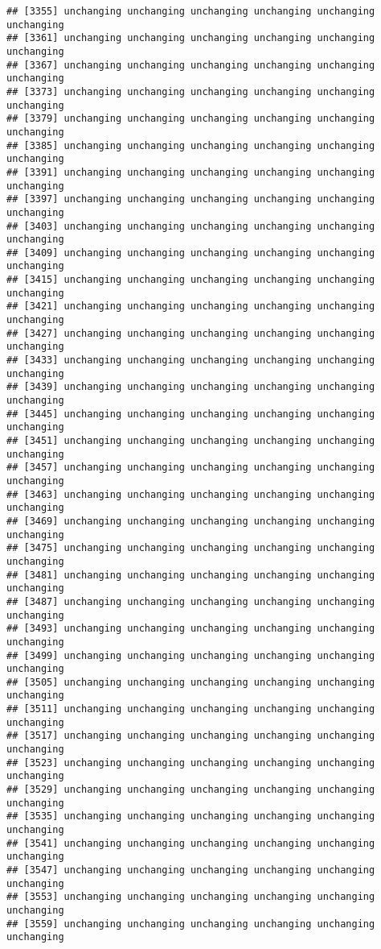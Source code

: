 \documentclass[]{article}
\begin{document}
\begin{verbatim}
## [3355] unchanging unchanging unchanging unchanging unchanging unchanging
## [3361] unchanging unchanging unchanging unchanging unchanging unchanging
## [3367] unchanging unchanging unchanging unchanging unchanging unchanging
## [3373] unchanging unchanging unchanging unchanging unchanging unchanging
## [3379] unchanging unchanging unchanging unchanging unchanging unchanging
## [3385] unchanging unchanging unchanging unchanging unchanging unchanging
## [3391] unchanging unchanging unchanging unchanging unchanging unchanging
## [3397] unchanging unchanging unchanging unchanging unchanging unchanging
## [3403] unchanging unchanging unchanging unchanging unchanging unchanging
## [3409] unchanging unchanging unchanging unchanging unchanging unchanging
## [3415] unchanging unchanging unchanging unchanging unchanging unchanging
## [3421] unchanging unchanging unchanging unchanging unchanging unchanging
## [3427] unchanging unchanging unchanging unchanging unchanging unchanging
## [3433] unchanging unchanging unchanging unchanging unchanging unchanging
## [3439] unchanging unchanging unchanging unchanging unchanging unchanging
## [3445] unchanging unchanging unchanging unchanging unchanging unchanging
## [3451] unchanging unchanging unchanging unchanging unchanging unchanging
## [3457] unchanging unchanging unchanging unchanging unchanging unchanging
## [3463] unchanging unchanging unchanging unchanging unchanging unchanging
## [3469] unchanging unchanging unchanging unchanging unchanging unchanging
## [3475] unchanging unchanging unchanging unchanging unchanging unchanging
## [3481] unchanging unchanging unchanging unchanging unchanging unchanging
## [3487] unchanging unchanging unchanging unchanging unchanging unchanging
## [3493] unchanging unchanging unchanging unchanging unchanging unchanging
## [3499] unchanging unchanging unchanging unchanging unchanging unchanging
## [3505] unchanging unchanging unchanging unchanging unchanging unchanging
## [3511] unchanging unchanging unchanging unchanging unchanging unchanging
## [3517] unchanging unchanging unchanging unchanging unchanging unchanging
## [3523] unchanging unchanging unchanging unchanging unchanging unchanging
## [3529] unchanging unchanging unchanging unchanging unchanging unchanging
## [3535] unchanging unchanging unchanging unchanging unchanging unchanging
## [3541] unchanging unchanging unchanging unchanging unchanging unchanging
## [3547] unchanging unchanging unchanging unchanging unchanging unchanging
## [3553] unchanging unchanging unchanging unchanging unchanging unchanging
## [3559] unchanging unchanging unchanging unchanging unchanging unchanging

\end{verbatim}
\end{document}
